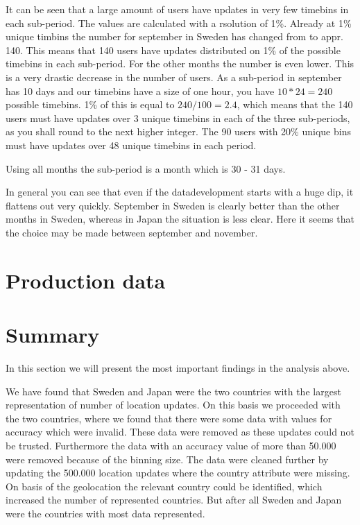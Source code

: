 It can be seen that a large amount of users have updates in very few timebins in each sub-period. The values are calculated with a rsolution of 1\%. Already at 1\% unique timbins the number for september in Sweden has changed from \numberUsersSweden{} to appr. 140. This means that 140 users have updates distributed on 1\% of the possible timebins in each sub-period. For the other months the number is even lower. This is a very drastic decrease in the number of users. 
As a sub-period in september has 10 days and our timebins have a size of one hour, you have $10*24=240$ possible  timebins. 1\% of this is equal to $240/100=2.4$, which means that the 140 users must have updates over 3 unique timebins in each of the three sub-periods, as you shall round to the next higher integer. 
The 90 users with 20\% unique bins must have updates over 48 unique timebins in each period. 

Using all months the sub-period is a month which is 30 - 31 days. 

In general you can see that even if the datadevelopment starts with a huge dip, it flattens out very quickly. September in Sweden is clearly better than the other months in Sweden, whereas in Japan the situation is less clear. Here it seems that the choice may be made between september and november. 




\section{Production data}


\section{Summary}
In this section we will present the most important findings in the analysis above. 

We have found that Sweden and Japan were the two countries with the largest representation of number of location updates.  On this basis we proceeded with the two countries, where we found that there were some data with values for accuracy which were invalid. These data were removed as these updates could not be trusted. Furthermore the data with an accuracy value of more than 50.000 were removed because of the binning size. 
The data were cleaned further by updating the 500.000 location updates where the country attribute were missing. On basis of the geolocation the relevant country could be identified, which increased the number of represented countries. But after all Sweden and Japan were the countries with most data represented. 

